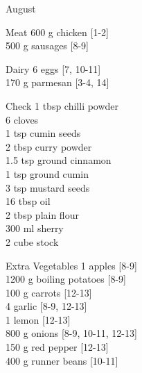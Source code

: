 \begin{menu}{August}
      \par\vfil %
      \begin{shoppinglist}{Meat}
      600 g chicken {\scriptsize[1-2]}\\
      500 g sausages {\scriptsize[8-9]}\\
      \end{shoppinglist}%
      \begin{shoppinglist}{Dairy}
      6  eggs {\scriptsize[7, 10-11]}\\
      170 g parmesan {\scriptsize[3-4, 14]}\\
      \end{shoppinglist}%
      \par\vfil %
      \vfil\clearpage %
      \begin{shoppinglist}{Check}
      1 tbsp chilli powder \\
      6  cloves \\
      1 tsp cumin seeds \\
      2 tbsp curry powder \\
      1.5 tsp ground cinnamon \\
      1 tsp ground cumin \\
      3 tsp mustard seeds \\
      16 tbsp oil \\
      2 tbsp plain flour \\
      300 ml sherry \\
      2 cube stock \\
      \end{shoppinglist}%
      \begin{shoppinglist}{Extra Vegetables}
      1  apples {\scriptsize[8-9]}\\
      1200 g boiling potatoes {\scriptsize[8-9]}\\
      100 g carrots {\scriptsize[12-13]}\\
      4  garlic {\scriptsize[8-9, 12-13]}\\
      1  lemon {\scriptsize[12-13]}\\
      800 g onions {\scriptsize[8-9, 10-11, 12-13]}\\
      150 g red pepper {\scriptsize[12-13]}\\
      400 g runner beans {\scriptsize[10-11]}\\
      \end{shoppinglist}%
      \par\vfil %
    \vfil\clearpage
  

\end{menu}
